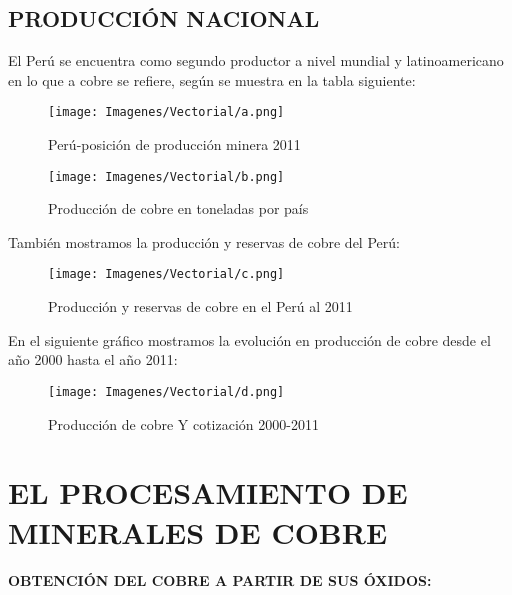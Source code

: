 \subsection{PRODUCCI\'ON NACIONAL}
El Per\'u se encuentra como segundo productor a nivel mundial y latinoamericano en lo que a cobre se refiere, seg\'un se muestra en la tabla siguiente:
\begin{figure}[H]
 \centering
 \texttt{[image: Imagenes/Vectorial/a.png]}
 \caption{Per\'u-posici\'on de producci\'on minera 2011}
 \label{fig:1}
\end{figure}

\begin{figure}[H]
 \centering
 \texttt{[image: Imagenes/Vectorial/b.png]}
 \caption{Producci\'on de cobre en toneladas por pa\'is}
 \label{fig:2}
\end{figure}

Tambi\'en mostramos la producci\'on y reservas de cobre del Per\'u:
\begin{figure}[H]
 \centering
 \texttt{[image: Imagenes/Vectorial/c.png]}
 \caption{Producci\'on y reservas de cobre en el Per\'u al 2011}
 \label{fig:3}
\end{figure}

En el siguiente gr\'afico mostramos la evoluci\'on en producci\'on de cobre desde el a\~no 2000 hasta el a\~no 2011:
\begin{figure}[H]
 \centering
 \texttt{[image: Imagenes/Vectorial/d.png]}
 \caption{Producci\'on de cobre Y cotizaci\'on 2000-2011}
 \label{fig:4}
\end{figure}

\section{EL PROCESAMIENTO DE MINERALES DE COBRE} 
\paragraph{OBTENCI\'ON DEL COBRE A PARTIR DE SUS \'OXIDOS:}

